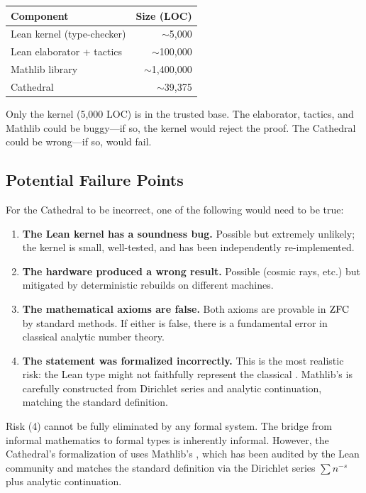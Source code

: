\documentclass[11pt,a4paper]{article}
\begin{document}
\begin{center}
\begin{tabular}{@{}lr@{}}
\toprule
\textbf{Component} & \textbf{Size (LOC)} \\
\midrule
Lean kernel (type-checker) & $\sim$5{,}000 \\
Lean elaborator + tactics & $\sim$100{,}000 \\
Mathlib library & $\sim$1{,}400{,}000 \\
Cathedral & $\sim$39{,}375 \\
\bottomrule
\end{tabular}
\end{center}

Only the kernel (5{,}000 LOC) is in the trusted base. The elaborator,
tactics, and Mathlib could be buggy---if so, the kernel would reject
the proof. The Cathedral could be wrong---if so, 
would fail.

\subsection{Potential Failure Points}

For the Cathedral to be incorrect, one of the following would need
to be true:

\begin{enumerate}
  \item \textbf{The Lean kernel has a soundness bug.} Possible but
    extremely unlikely; the kernel is small, well-tested, and has
    been independently re-implemented.
  \item \textbf{The hardware produced a wrong result.} Possible
    (cosmic rays, etc.) but mitigated by deterministic rebuilds on
    different machines.
  \item \textbf{The mathematical axioms are false.} Both axioms are
    provable in $\mathrm{ZFC}$ by standard methods. If either is false,
    there is a fundamental error in classical analytic number theory.
  \item \textbf{The statement was formalized incorrectly.} This is the
    most realistic risk: the Lean type  might
    not faithfully represent the classical \RH. Mathlib's
     is carefully constructed from Dirichlet series
    and analytic continuation, matching the standard definition.
\end{enumerate}

\begin{remark}
Risk (4) cannot be fully eliminated by any formal system. The bridge
from informal mathematics to formal types is inherently informal.
However, the Cathedral's formalization of \RH{} uses Mathlib's
, which has been audited by the Lean community
and matches the standard definition via the Dirichlet series
$\sum n^{-s}$ plus analytic continuation.
\end{remark}
\end{document}
